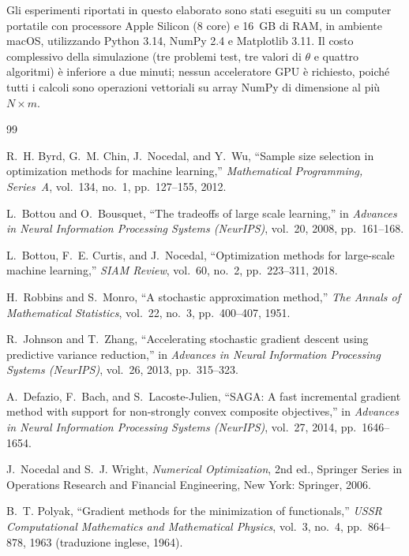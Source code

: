 \documentclass[a4paper,12pt]{article}
\numberwithin{equation}{section}
\numberwithin{figure}{section}
\numberwithin{table}{section}
\begin{document}
Gli esperimenti riportati in questo elaborato sono stati eseguiti su un
computer portatile con processore Apple Silicon (8 core) e 16~GB di RAM, in
ambiente macOS, utilizzando Python 3.14, NumPy 2.4 e Matplotlib 3.11. Il costo
complessivo della simulazione (tre problemi test, tre valori di $\theta$ e
quattro algoritmi) è inferiore a due minuti; nessun acceleratore GPU è
richiesto, poiché tutti i calcoli sono operazioni vettoriali su array NumPy di
dimensione al più $N \times m$.

\begin{thebibliography}{99}

R.~H. Byrd, G.~M. Chin, J.~Nocedal, and Y.~Wu,
``Sample size selection in optimization methods for machine learning,''
\textit{Mathematical Programming, Series~A}, vol.~134, no.~1, pp.~127--155,
2012.

L.~Bottou and O.~Bousquet,
``The tradeoffs of large scale learning,''
in \textit{Advances in Neural Information Processing Systems (NeurIPS)},
vol.~20, 2008, pp.~161--168.

L.~Bottou, F.~E. Curtis, and J.~Nocedal,
``Optimization methods for large-scale machine learning,''
\textit{SIAM Review}, vol.~60, no.~2, pp.~223--311, 2018.

H.~Robbins and S.~Monro,
``A stochastic approximation method,''
\textit{The Annals of Mathematical Statistics}, vol.~22, no.~3,
pp.~400--407, 1951.

R.~Johnson and T.~Zhang,
``Accelerating stochastic gradient descent using predictive variance
reduction,''
in \textit{Advances in Neural Information Processing Systems (NeurIPS)},
vol.~26, 2013, pp.~315--323.

A.~Defazio, F.~Bach, and S.~Lacoste-Julien,
``SAGA: A fast incremental gradient method with support for non-strongly
convex composite objectives,''
in \textit{Advances in Neural Information Processing Systems (NeurIPS)},
vol.~27, 2014, pp.~1646--1654.

J.~Nocedal and S.~J. Wright,
\textit{Numerical Optimization}, 2nd ed.,
Springer Series in Operations Research and Financial Engineering,
New York: Springer, 2006.

B.~T. Polyak,
``Gradient methods for the minimization of functionals,''
\textit{USSR Computational Mathematics and Mathematical Physics},
vol.~3, no.~4, pp.~864--878, 1963 (traduzione inglese, 1964).


\end{thebibliography}
\end{document}
